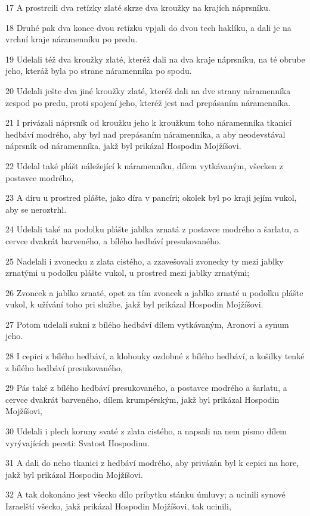 \par 17 A prostrcili dva retízky zlaté skrze dva kroužky na krajích náprsníku.
\par 18 Druhé pak dva konce dvou retízku vpjali do dvou tech haklíku, a dali je na vrchní kraje náramenníku po predu.
\par 19 Udelali též dva kroužky zlaté, kteréž dali na dva kraje náprsníku, na té obrube jeho, kteráž byla po strane náramenníka po spodu.
\par 20 Udelali ješte dva jiné kroužky zlaté, kteréž dali na dve strany náramenníka zespod po predu, proti spojení jeho, kteréž jest nad prepásaním náramenníka.
\par 21 I privázali náprsník od kroužku jeho k kroužkum toho náramenníka tkanicí hedbáví modrého, aby byl nad prepásaním náramenníka, a aby neodevstával náprsník od náramenníka, jakž byl prikázal Hospodin Mojžíšovi.
\par 22 Udelal také plášt náležející k náramenníku, dílem vytkávaným, všecken z postavce modrého,
\par 23 A díru u prostred plášte, jako díra v pancíri; okolek byl po kraji jejím vukol, aby se neroztrhl.
\par 24 Udelali také na podolku plášte jablka zrnatá z postavce modrého a šarlatu, a cervce dvakrát barveného, a bílého hedbáví presukovaného.
\par 25 Nadelali i zvonecku z zlata cistého, a zzavešovali zvonecky ty mezi jablky zrnatými u podolku plášte vukol, u prostred mezi jablky zrnatými;
\par 26 Zvoncek a jablko zrnaté, opet za tím zvoncek a jablko zrnaté u podolku plášte vukol, k užívání toho pri službe, jakž byl prikázal Hospodin Mojžíšovi.
\par 27 Potom udelali sukni z bílého hedbáví dílem vytkávaným, Aronovi a synum jeho.
\par 28 I cepici z bílého hedbáví, a klobouky ozdobné z bílého hedbáví, a košilky tenké z bílého hedbáví presukovaného,
\par 29 Pás také z bílého hedbáví presukovaného, a postavce modrého a šarlatu, a cervce dvakrát barveného, dílem krumpérským, jakž byl prikázal Hospodin Mojžíšovi,
\par 30 Udelali i plech koruny svaté z zlata cistého, a napsali na nem písmo dílem vyrývajících peceti: Svatost Hospodinu.
\par 31 A dali do neho tkanici z hedbáví modrého, aby privázán byl k cepici na hore, jakž byl prikázal Hospodin Mojžíšovi.
\par 32 A tak dokonáno jest všecko dílo príbytku stánku úmluvy; a ucinili synové Izraelští všecko, jakž prikázal Hospodin Mojžíšovi, tak ucinili,
